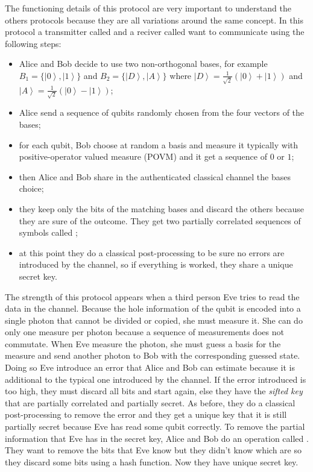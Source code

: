 The functioning details of this protocol are very important to understand the others protocols because they are all variations around the same concept. In this protocol a transmitter called  and a reciver called  want to communicate using the following steps:

\begin{itemize}
  \item Alice and Bob decide to use two non-orthogonal bases, for example $B_1 = \{\left|0\right>, \left|1\right>\}$ and $B_2 = \{\left|D\right>, \left|A\right>\}$ where $\left|D\right> = \frac{1}{\sqrt{2}} (\left|0\right> + \left|1\right>)$ and $\left|A\right> = \frac{1}{\sqrt{2}} (\left|0\right> - \left|1\right>)$;
  \item Alice send a sequence of qubits randomly chosen from the four vectors of the bases;
  \item for each qubit, Bob choose at random a basis and measure it typically with positive-operator valued measure (POVM) and it get a sequence of $0$ or $1$;
  \item then Alice and Bob share in the authenticated classical channel the bases choice;
  \item they keep only the bits of the matching bases and discard the others because they are sure of the outcome. They get two partially correlated sequences of symbols called ;
  \item at this point they do a classical post-processing to be sure no errors are introduced by the channel, so if everything is worked, they share a unique secret key.
\end{itemize}

The strength of this protocol appears when a third person Eve tries to read the data in the channel. Because the hole information of the qubit is encoded into a single photon that cannot be divided or copied, she must measure it. She can do only one measure per photon because a sequence of measurements does not commutate. When Eve measure the photon, she must guess a basis for the measure and send another photon to Bob with the corresponding guessed state. Doing so Eve introduce an error that Alice and Bob can estimate because it is additional to the typical one introduced by the channel. If the error introduced is too high, they must discard all bits and start again, else they have the \textit{sifted key} that are partially correlated and partially secret. As before, they do a classical post-processing to remove the error and they get a unique key that it is still partially secret because Eve has read some qubit correctly. To remove the partial information that Eve has in the secret key, Alice and Bob do an operation called . They want to remove the bits that Eve know but they didn't know which are so they discard some bits using a hash function. Now they have unique secret key.


